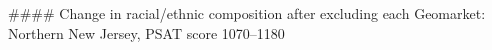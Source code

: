 #### Change in racial/ethnic composition after excluding each Geomarket: Northern New Jersey, PSAT score 1070–1180
